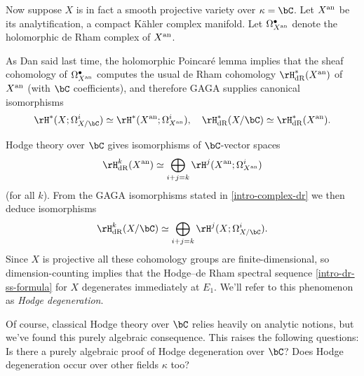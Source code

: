 \begin{nothing}
  \label{intro-complex}
  Now suppose $X$ is in fact a smooth projective variety over $\kappa = \bC$. Let $X^{\mathrm{an}}$ be its analytification, a compact K\"ahler complex manifold. Let $\Omega^\bullet_{X^{\mathrm{an}}}$ denote the holomorphic de Rham complex of $X^{\mathrm{an}}$.

  \begin{subnothing}
    \label{intro-complex-dr}
    As Dan said last time, the holomorphic Poincar\'e lemma implies that the sheaf cohomology of $\Omega^\bullet_{X^{\mathrm{an}}}$ computes the usual de Rham cohomology $\rH_\dR^*(X^\an)$ of $X^{\mathrm{an}}$ (with $\bC$ coefficients), and therefore GAGA supplies canonical isomorphisms
    \[
      \rH^*(X;\Omega^i_{X/\bC}) \iso \rH^*(X^\an;\Omega^i_{X^\an}), \quad
      \rH_\dR^*(X/\bC) \iso \rH_\dR^*(X^\an).
    \]
  \end{subnothing}

  \begin{subnothing}
    \label{intro-complex-degeneration}
    Hodge theory over $\bC$ gives isomorphisms of $\bC$-vector spaces
    \[
      \rH_\dR^k(X^\an) \iso \bigoplus_{i+j=k} \rH^j(X^\an;\Omega^i_{X^\an})
    \]
    (for all $k$). From the GAGA isomorphisms stated in \cref{intro-complex-dr} we then deduce isomorphisms
    \[
      \rH_\dR^k(X/\bC) \iso \bigoplus_{i+j=k} \rH^j(X;\Omega^i_{X/\bC}).
    \]
    Since $X$ is projective all these cohomology groups are finite-dimensional, so dimension-counting implies that the Hodge--de Rham spectral sequence \cref{intro-dr-ss-formula} for $X$ degenerates immediately at $E_1$. We'll refer to this phenomenon as \emph{Hodge degeneration}.

    Of course, classical Hodge theory over $\bC$ relies heavily on analytic notions, but we've found this purely algebraic consequence. This raises the following questions: Is there a purely algebraic proof of Hodge degeneration over $\bC$? Does Hodge degeneration occur over other fields $\kappa$ too?
  \end{subnothing}
\end{nothing}

